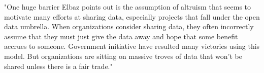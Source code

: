 \documentclass{article}
\begin{document}






"One huge barrier Elbaz points out is the assumption of altruism that seems to motivate many
efforts at sharing data, especially projects that fall under the open data umbrella. When
organizations consider sharing data, they often incorrectly assume that they must just give the
data away and hope that some benefit accrues to someone. Government initiative have resulted
many victories using this model. But organizations are sitting on massive troves of data that
won’t be shared unless there is a fair trade."





\end{document}
